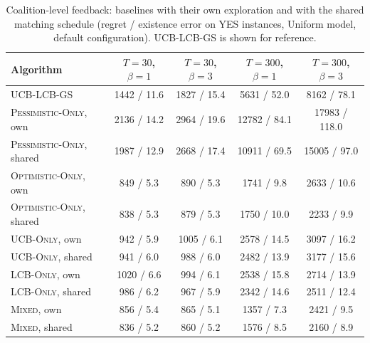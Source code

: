 \begin{table}[h]
\centering\small\setlength{\tabcolsep}{3.5pt}
\caption{Coalition-level feedback: baselines with their own exploration and with the shared matching schedule (regret / existence error on YES instances, Uniform model, default configuration). \textsc{UCB-LCB-GS} is shown for reference.}
\label{tab:bandit-shared}
\begin{tabular}{lcccc}
\toprule
Algorithm & $T=30$, $\beta=1$ & $T=30$, $\beta=3$ & $T=300$, $\beta=1$ & $T=300$, $\beta=3$ \\
\midrule
\textsc{UCB-LCB-GS} & 1442 / 11.6 & 1827 / 15.4 & 5631 / 52.0 & 8162 / 78.1 \\
\textsc{Pessimistic-Only}, own & 2136 / 14.2 & 2964 / 19.6 & 12782 / 84.1 & 17983 / 118.0 \\
\textsc{Pessimistic-Only}, shared & 1987 / 12.9 & 2668 / 17.4 & 10911 / 69.5 & 15005 / 97.0 \\
\textsc{Optimistic-Only}, own & 849 / 5.3 & 890 / 5.3 & 1741 / 9.8 & 2633 / 10.6 \\
\textsc{Optimistic-Only}, shared & 838 / 5.3 & 879 / 5.3 & 1750 / 10.0 & 2233 / 9.9 \\
\textsc{UCB-Only}, own & 942 / 5.9 & 1005 / 6.1 & 2578 / 14.5 & 3097 / 16.2 \\
\textsc{UCB-Only}, shared & 941 / 6.0 & 988 / 6.0 & 2482 / 13.9 & 3177 / 15.6 \\
\textsc{LCB-Only}, own & 1020 / 6.6 & 994 / 6.1 & 2538 / 15.8 & 2714 / 13.9 \\
\textsc{LCB-Only}, shared & 986 / 6.2 & 967 / 5.9 & 2342 / 14.6 & 2511 / 12.4 \\
\textsc{Mixed}, own & 856 / 5.4 & 865 / 5.1 & 1357 / 7.3 & 2421 / 9.5 \\
\textsc{Mixed}, shared & 836 / 5.2 & 860 / 5.2 & 1576 / 8.5 & 2160 / 8.9 \\
\bottomrule
\end{tabular}
\end{table}
